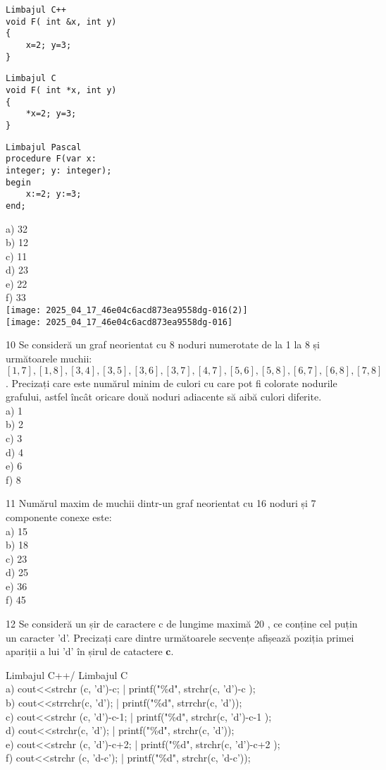 \begin{verbatim}
Limbajul C++
void F( int &x, int y)
{
    x=2; y=3;
}
\end{verbatim}

\begin{verbatim}
Limbajul C
void F( int *x, int y)
{
    *x=2; y=3;
}
\end{verbatim}

\begin{verbatim}
Limbajul Pascal
procedure F(var x:
integer; y: integer);
begin
    x:=2; y:=3;
end;
\end{verbatim}

a) 32\\
b) 12\\
c) 11\\
d) 23\\
e) 22\\
f) 33\\
\texttt{[image: 2025\_04\_17\_46e04c6acd873ea9558dg-016(2)]}\\
\texttt{[image: 2025\_04\_17\_46e04c6acd873ea9558dg-016]}

10 Se consideră un graf neorientat cu 8 noduri numerotate de la 1 la 8 și următoarele muchii: $[1,7],[1,8],[3,4],[3,5],[3,6],[3,7],[4,7],[5,6],[5,8],[6,7],[6,8],[7,8]$. Precizați care este numărul minim de culori cu care pot fi colorate nodurile grafului, astfel încât oricare două noduri adiacente să aibă culori diferite.\\
a) 1\\
b) 2\\
c) 3\\
d) 4\\
e) 6\\
f) 8

11 Numărul maxim de muchii dintr-un graf neorientat cu 16 noduri și 7 componente conexe este:\\
a) 15\\
b) 18\\
c) 23\\
d) 25\\
e) 36\\
f) 45

12 Se consideră un șir de caractere c de lungime maximă 20 , ce conține cel puțin un caracter 'd'. Precizați care dintre următoarele secvențe afișează poziția primei apariții a lui 'd' în șirul de catactere $\mathbf{c}$.

Limbajul C++/ Limbajul C\\
a) cout<<strchr (c, 'd')-c; | printf("\%d", strchr(c, 'd')-c );\\
b) cout<<strrchr(c, 'd'); | printf("\%d", strrchr(c, 'd'));\\
c) cout<<strchr (c, 'd')-c-1; | printf("\%d", strchr(c, 'd')-c-1 );\\
d) cout<<strchr(c, 'd'); | printf("\%d", strchr(c, 'd'));\\
e) cout<<strchr (c, 'd')-c+2; | printf("\%d", strchr(c, 'd')-c+2 );\\
f) cout<<strchr (c, 'd-c'); | printf("\%d", strchr(c, 'd-c'));

